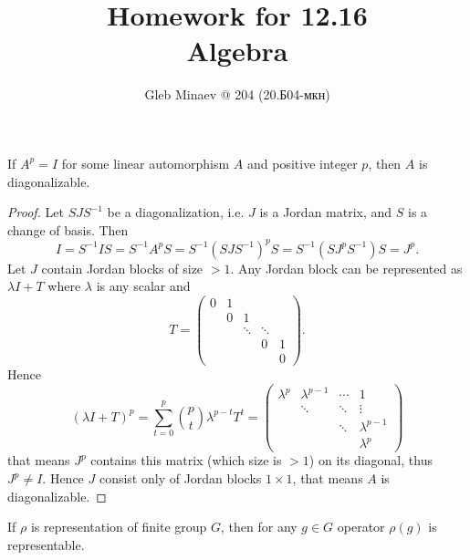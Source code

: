 \documentclass[12pt,a4paper]{article}
\title{Homework for 12.16\\Algebra}
\author{Gleb Minaev @ 204 (20.Б04-мкн)}
\date{}
\begin{document}
    \maketitle

    \begin{multicols}{2}
        \tableofcontents
    \end{multicols}

    \begin{lemma}
        If $A^p = I$ for some linear automorphism $A$ and positive integer $p$, then $A$ is diagonalizable.
    \end{lemma}

    \begin{proof}
        Let $S J S^{-1}$ be a diagonalization, i.e. $J$ is a Jordan matrix, and $S$ is a change of basis. Then
        \[I = S^{-1} I S = S^{-1} A^p S = S^{-1} (S J S^{-1})^p S = S^{-1} (S J^p S^{-1}) S = J^p.\]
        Let $J$ contain Jordan blocks of size $> 1$. Any Jordan block can be represented as $\lambda I + T$ where $\lambda$ is any scalar and
        \[
            T = 
            \begin{pmatrix}
                0& 1\\
                &0 & 1\\
                &&\ddots & \ddots\\
                &&&0 & 1\\
                &&&&0
            \end{pmatrix}.
        \]
        Hence
        \[
            (\lambda I + T)^p
            = \sum_{t=0}^p \binom{p}{t} \lambda^{p-t} T^t
            =
            \begin{pmatrix}
                \lambda^p &\lambda^{p-1} &\cdots &1\\
                &\ddots &\ddots &\vdots\\
                &&\ddots &\lambda^{p-1}\\
                &&&\lambda^p
            \end{pmatrix}
        \]
        that means $J^p$ contains this matrix (which size is $> 1$) on its diagonal, thus $J^p \neq I$. Hence $J$ consist only of Jordan blocks $1 \times 1$, that means $A$ is diagonalizable.
    \end{proof}

    \begin{corollary}
        If $\rho$ is representation of finite group $G$, then for any $g \in G$ operator $\rho(g)$ is representable.
    \end{corollary}
\end{document}
